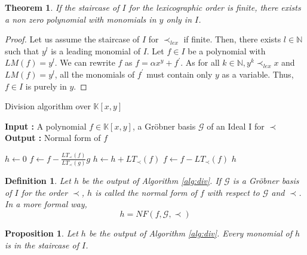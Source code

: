 \documentclass{article}
\newtheorem{theorem}{Theorem}[section]
\newtheorem{definition}{Definition}[section]
\newtheorem{proposition}{Proposition}[section]
\begin{document}
\begin{theorem}
    If the staircase of $I$ for the lexicographic order is finite, there exists a non zero polynomial with monomials in $y$ only in $I$.
\end{theorem}

\begin{proof}
    Let us assume the staircase of $I$ for $\prec_{lex}$ if finite. Then, there exists $l \in \mathbb{N}$ such that $y^{l}$ is a leading monomial of $I$. Let $f \in I$ be a polynomial with $LM(f) = y^{l}$. We can rewrite $f$ as $f = \alpha x^{y} + f^{\prime}$. As for all $k \in \mathbb{N}, y^{k} \prec_{lex} x$ and $LM(f) = y^{l}$, all the monomials of $f^{\prime}$ must contain only $y$ as a variable. Thus,  $f \in I$ is purely in $y$.
\end{proof}

\begin{algorithm}
\caption{Division algorithm over $\mathbb{K}[x, y]$} \label{alg:div}
\textbf{Input : }A polynomial $f \in \mathbb{K}[x, y]$, a Gröbner basis $\mathscr{G}$ of an Ideal I for $\prec$ \\
\textbf{Output : }Normal form of $f$
\begin{algorithmic}
    \State $h \gets 0$
            \State $f \gets f- \displaystyle \frac{LT_{\prec}(f)}{LT_{\prec}(g)}g$
        \Else
            \State $h \gets h + LT_{\prec}(f)$
            \State $f \gets f - LT_{\prec}(f)$
        \EndIf
    \EndWhile
    \State \Return $h$
\end{algorithmic}
\end{algorithm}


\begin{definition}
Let $h$ be the output of Algorithm \ref{alg:div}. If $\mathscr{G}$ is a Gröbner basis of $I$ for the order $\prec$, $h$ is called the normal form of $f$ with respect to $\mathscr{G}$ and $\prec$. In a more formal way, 
    \begin{displaymath}
        h = NF(f, \mathscr{G}, \prec)
    \end{displaymath}
\end{definition}

\begin{proposition} \label{proposition:monomials-h-staircase}
    Let $h$ be the output of Algorithm \ref{alg:div}. Every monomial of $h$ is in the staircase of $I$.
\end{proposition}
    
\end{document}

